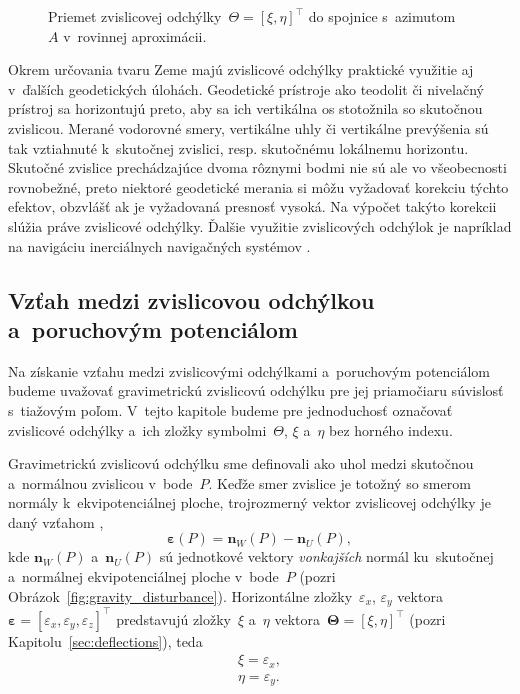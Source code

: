 \documentclass[a4paper, 12pt]{book}
\let\vec\mathbf
\begin{document}
\begin{figure}[bt]
\centering

\caption{Priemet zvislicovej odchýlky~$\Theta = [\xi, \eta]^\top$ do spojnice 
s~azimutom~$A$ v~rovinnej aproximácii.}
\label{fig:deflections_projection}
\end{figure}

Okrem určovania tvaru Zeme majú zvislicové odchýlky praktické využitie aj 
v~ďalších geodetických úlohách.  Geodetické prístroje ako teodolit či nivelačný 
prístroj sa horizontujú preto, aby sa ich vertikálna os stotožnila so skutočnou 
zvislicou.  Merané vodorovné smery, vertikálne uhly či vertikálne prevýšenia sú 
tak vztiahnuté k~skutočnej zvislici, resp. skutočnému lokálnemu horizontu.  
Skutočné zvislice prechádzajúce dvoma rôznymi bodmi nie sú ale vo všeobecnosti 
rovnobežné, preto niektoré geodetické merania si môžu vyžadovať korekciu týchto 
efektov, obzvlášť ak je vyžadovaná presnosť vysoká.  Na výpočet takýto korekcii 
slúžia práve zvislicové odchýlky.  Ďalšie využitie zvislicových odchýlok je 
napríklad na navigáciu inerciálnych navigačných systémov \parencite[pozri 
napríklad][]{Jekeli2000}.


\subsection{Vzťah medzi zvislicovou odchýlkou a~poruchovým potenciálom}
\label{sec:deflections_disturbing_potential}

Na získanie vzťahu medzi zvislicovými odchýlkami a~poruchovým potenciálom 
budeme uvažovať gravimetrickú zvislicovú odchýlku pre jej priamočiaru súvislosť 
s~tiažovým poľom.  V~tejto kapitole budeme pre jednoduchosť označovať 
zvislicové odchýlky a~ich zložky symbolmi~$\Theta$, $\xi$ a~$\eta$ bez horného 
indexu.

Gravimetrickú zvislicovú odchýlku sme definovali ako uhol medzi skutočnou 
a~normálnou zvislicou v~bode~$P$.  Keďže smer zvislice je totožný so smerom 
normály k~ekvipotenciálnej ploche, trojrozmerný vektor zvislicovej odchýlky je 
daný vzťahom \parencite{SansoGeoidDetermination},
%
\begin{equation}
\label{eq:deflection_eps}
\boldsymbol\varepsilon(P) = \vec n_W(P) - \vec n_U(P){,}
\end{equation}
%
kde $\vec n_W(P)$ a~$\vec n_U(P)$ sú jednotkové vektory \emph{vonkajších} 
normál ku~skutočnej a~normálnej ekvipotenciálnej ploche v~bode~$P$ (pozri 
Obrázok~\ref{fig:gravity_disturbance}).  Horizontálne zložky~$\varepsilon_x$, 
$\varepsilon_y$ vektora~$\boldsymbol\varepsilon = [\varepsilon_x, 
\varepsilon_y, \varepsilon_z]^\top$ predstavujú zložky~$\xi$ a~$\eta$ 
vektora~$\boldsymbol\Theta = [\xi, \eta]^\top$ (pozri 
Kapitolu~\ref{sec:deflections}), teda
%
\begin{equation}
\label{eq:xi_eta_eps}
\begin{split}
\xi = \varepsilon_x{,}\\
\eta = \varepsilon_y{.}
\end{split}
\end{equation}
\end{document}
